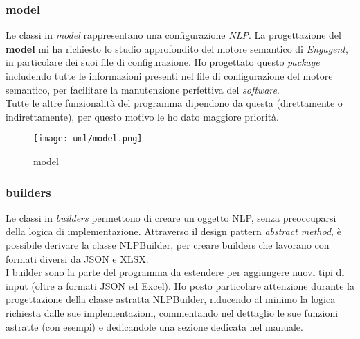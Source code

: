 \subsubsection{model}\label{sec:progettazione:model} %
Le classi in \emph{model}\glsfirstoccur{} rappresentano una configurazione \textit{NLP}.
La progettazione del \textbf{model} mi ha richiesto lo studio approfondito del motore semantico di \textit{Engagent}, in particolare dei suoi file di configurazione. Ho progettato questo \textit{package} includendo tutte le informazioni presenti nel file di configurazione del motore semantico, per facilitare la manutenzione perfettiva del \textit{software}.\\ Tutte le altre funzionalità del programma dipendono da questa (direttamente o indirettamente), per questo motivo le ho dato maggiore priorità. 

\begin{namespacedesc}
\end{namespacedesc}
\begin{figure}[H]
    \centering
    \texttt{[image: uml/model.png]} 
    \caption{model}
    \label{logo:model}
\end{figure}

\subsubsection{builders} %
Le classi in \textit{builders} permettono di creare un oggetto NLP, senza preoccuparsi della logica di implementazione. Attraverso il design pattern \textit{abstract method}, è possibile derivare la classe NLPBuilder, per creare builders che lavorano con formati diversi da JSON e XLSX.\\
I builder sono la parte del programma da estendere per aggiungere nuovi tipi di input (oltre a formati JSON ed Excel). Ho posto particolare attenzione durante la progettazione della classe astratta NLPBuilder, riducendo al minimo la logica richiesta dalle sue implementazioni, commentando nel dettaglio le sue funzioni astratte (con esempi) e dedicandole una sezione dedicata nel manuale.\\

